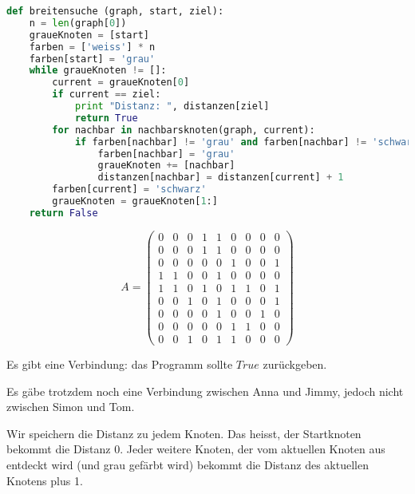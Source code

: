 \begin{lsg}
\hfill
\begin{lstlisting}[language=Python,basicstyle=\small,tabsize=3]
def breitensuche (graph, start, ziel):
	n = len(graph[0])
	graueKnoten = [start]
	farben = ['weiss'] * n
	farben[start] = 'grau'
	while graueKnoten != []:
		current = graueKnoten[0]
		if current == ziel:
			print "Distanz: ", distanzen[ziel]
			return True
		for nachbar in nachbarsknoten(graph, current):
			if farben[nachbar] != 'grau' and farben[nachbar] != 'schwarz':
				farben[nachbar] = 'grau'
				graueKnoten += [nachbar]
				distanzen[nachbar] = distanzen[current] + 1
		farben[current] = 'schwarz'
		graueKnoten = graueKnoten[1:]
	return False
\end{lstlisting}
\end{lsg}

\begin{lsg}
\[A =  \begin{pmatrix}
  0 & 0 & 0 & 1 & 1 & 0 & 0 & 0 & 0  \\
  0 & 0 & 0 & 1 & 1 & 0 & 0 & 0 & 0  \\
  0 & 0 & 0 & 0 & 0 & 1 & 0 & 0 & 1  \\
  1 & 1 & 0 & 0 & 1 & 0 & 0 & 0 & 0  \\
  1 & 1 & 0 & 1 & 0 & 1 & 1 & 0 & 1  \\
  0 & 0 & 1 & 0 & 1 & 0 & 0 & 0 & 1  \\
  0 & 0 & 0 & 0 & 1 & 0 & 0 & 1 & 0  \\
  0 & 0 & 0 & 0 & 0 & 1 & 1 & 0 & 0  \\
  0 & 0 & 1 & 0 & 1 & 1 & 0 & 0 & 0 
 \end{pmatrix}
  \]
\end{lsg}

\begin{lsg}
Es gibt eine Verbindung: das Programm sollte $True$ zur\"uckgeben.
\end{lsg}

\begin{lsg}
Es g\"abe trotzdem noch eine Verbindung zwischen Anna und Jimmy, jedoch nicht zwischen Simon und Tom.
\end{lsg}

\begin{lsg}
Wir speichern die Distanz zu jedem Knoten. Das heisst, der Startknoten bekommt die Distanz 0. Jeder weitere Knoten, der vom aktuellen Knoten aus entdeckt wird (und grau gef\"arbt wird) bekommt die Distanz des aktuellen Knotens plus 1.
\end{lsg}

